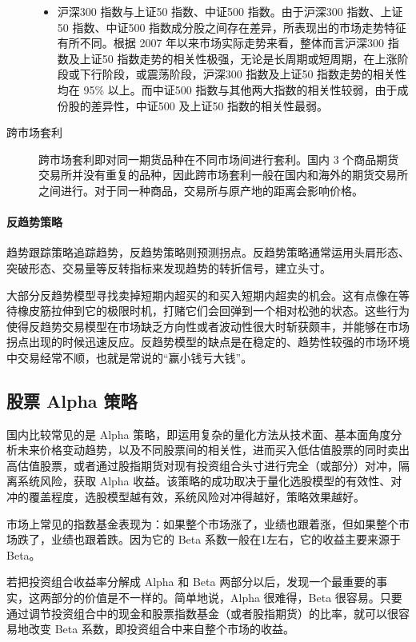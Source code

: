 \begin{description}
\begin{itemize}
            \item 沪深300 指数与上证50 指数、中证500 指数。由于沪深300 指数、上证50 指数、中证500 指数成分股之间存在差异，所表现出的市场走势特征有所不同。根据 2007 年以来市场实际走势来看，整体而言沪深300 指数及上证50 指数走势的相关性极强，无论是长周期或短周期，在上涨阶段或下行阶段，或震荡阶段，沪深300 指数及上证50 指数走势的相关性均在 95\% 以上。而中证500 指数与其他两大指数的相关性较弱，由于成份股的差异性，中证500 及上证50 指数的相关性最弱。
        \end{itemize}
    \item[跨市场套利] 跨市场套利即对同一期货品种在不同市场间进行套利。国内 3 个商品期货交易所并没有重复的品种，因此跨市场套利一般在国内和海外的期货交易所之间进行。对于同一种商品，交易所与原产地的距离会影响价格。
\end{description}
\paragraph{反趋势策略} 趋势跟踪策略追踪趋势，反趋势策略则预测拐点。反趋势策略通常运用头肩形态、突破形态、交易量等反转指标来发现趋势的转折信号，建立头寸。

大部分反趋势模型寻找卖掉短期内超买的和买入短期内超卖的机会。这有点像在等待橡皮筋拉伸到它的极限时机，打赌它们会回弹到一个相对松弛的状态。这些行为使得反趋势交易模型在市场缺乏方向性或者波动性很大时斩获颇丰，并能够在市场拐点出现的时候迅速反应。反趋势模型的缺点是在稳定的、趋势性较强的市场环境中交易经常不顺，也就是常说的“赢小钱亏大钱”。
\subsection{股票 Alpha 策略}
国内比较常见的是 Alpha 策略，即运用复杂的量化方法从技术面、基本面角度分析未来价格变动趋势，以及不同股票间的相关性，进而买入低估值股票的同时卖出高估值股票，或者通过股指期货对现有投资组合头寸进行完全（或部分）对冲，隔离系统风险，获取 Alpha 收益。该策略的成功取决于量化选股模型的有效性、对冲的覆盖程度，选股模型越有效，系统风险对冲得越好，策略效果越好。

市场上常见的指数基金表现为：如果整个市场涨了，业绩也跟着涨，但如果整个市场跌了，业绩也跟着跌。因为它的 Beta 系数一般在1左右，它的收益主要来源于 Beta。

若把投资组合收益率分解成 Alpha 和 Beta 两部分以后，发现一个最重要的事实，这两部分的价值是不一样的。简单地说，Alpha 很难得，Beta 很容易。只要通过调节投资组合中的现金和股票指数基金（或者股指期货）的比率，就可以很容易地改变 Beta 系数，即投资组合中来自整个市场的收益。

